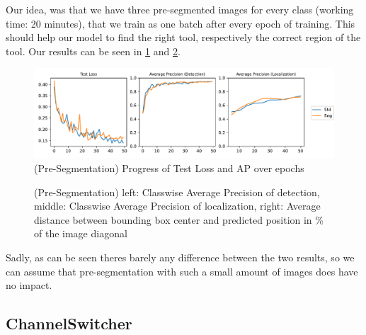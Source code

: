 Our idea, was that we have three pre-segmented images for every class (working time: 20 minutes), that we train as one batch after every epoch of training. This should help our model to find the right tool, respectively the correct region of the tool. Our results can be seen in \ref{fig:seg_aps} and \ref{fig:seg_distances}.\\


\begin{figure}[h]
	\centering
	\includegraphics[width=15cm]{4_experiments/images/5_seg/APs.pdf}
	\caption{(Pre-Segmentation) Progress of Test Loss and AP over epochs}
	\label{fig:seg_aps}
\end{figure}

\begin{figure}[h]
	\centering
	\caption{(Pre-Segmentation) left: Classwise Average Precision of detection, middle: Classwise Average Precision of localization, right: Average distance between bounding box center and predicted position in \% of the image diagonal}
	\label{fig:seg_distances}
\end{figure}

Sadly, as can be seen theres barely any difference between the two results, so we can assume that pre-segmentation with such a small amount of images does have no impact.

\FloatBarrier
\subsection{ChannelSwitcher}

